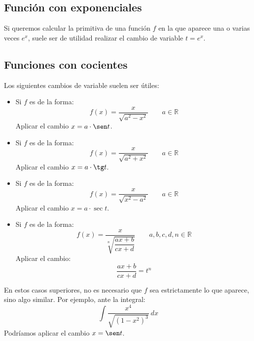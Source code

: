 \subsection{Función con exponenciales}
Si queremos calcular la primitiva de una función $f$ en la que aparece una o varias veces $e^x$, suele ser de utilidad realizar el cambio de variable $t=e^x$.

\subsection{Funciones con cocientes}
Los siguientes cambios de variable suelen ser útiles:
\begin{itemize}
    \item Si $f$ es de la forma:
        \begin{equation*}
            f(x) = \dfrac{x}{\sqrt{a^2 - x^2}}\qquad a\in \mathbb{R}
        \end{equation*}
        Aplicar el cambio $x = a\cdot \sen t$.
    \item Si $f$ es de la forma:
        \begin{equation*}
            f(x) = \dfrac{x}{\sqrt{a^2 + x^2}}\qquad a\in \mathbb{R}
        \end{equation*}
        Aplicar el cambio $x = a\cdot \tg t$.
    \item Si $f$ es de la forma:
        \begin{equation*}
            f(x) = \dfrac{x}{\sqrt{x^2 - a^2}}\qquad a\in \mathbb{R}
        \end{equation*}
        Aplicar el cambio $x=a\cdot \sec t$.
    \item Si $f$ es de la forma:
        \begin{equation*}
            f(x) = \dfrac{x}{\sqrt[n]{\dfrac{ax+b}{cx+d}}}\qquad a,b,c,d,n\in \mathbb{R}
        \end{equation*}
        Aplicar el cambio:
        \begin{equation*}
            \dfrac{ax+b}{cx+d} = t^n
        \end{equation*}
\end{itemize}
En estos casos superiores, no es necesario que $f$ sea estrictamente lo que aparece, sino algo similar. Por ejemplo, ante la integral:
\begin{equation*}
    \displaystyle\int \dfrac{x^4}{\sqrt{{\left(1-x^2\right)}^{3}}}~dx 
\end{equation*}
Podríamos aplicar el cambio $x = \sen t$.

